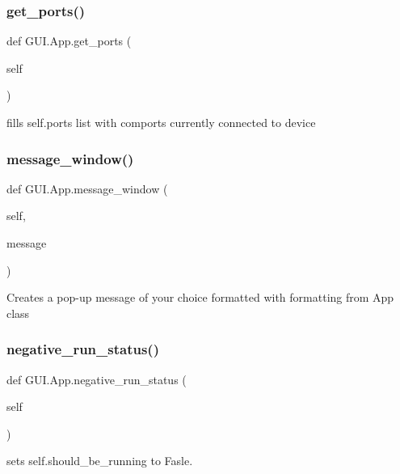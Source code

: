 \subsubsection{\texorpdfstring{get\_ports()}{get\_ports()}}
{\footnotesize\ttfamily def G\+U\+I.\+App.\+get\+\_\+ports (\begin{DoxyParamCaption}\item[{}]{self }\end{DoxyParamCaption})}

\begin{DoxyVerb}fills self.ports list with comports currently connected to device
\end{DoxyVerb}
 \mbox{\label{class_g_u_i_1_1_app_a7e1fdfe0c29ab317d09afccdc5c89004}} 
\subsubsection{\texorpdfstring{message\_window()}{message\_window()}}
{\footnotesize\ttfamily def G\+U\+I.\+App.\+message\+\_\+window (\begin{DoxyParamCaption}\item[{}]{self,  }\item[{}]{message }\end{DoxyParamCaption})}

\begin{DoxyVerb}Creates a pop-up message of your choice formatted with 
formatting from App class\end{DoxyVerb}
 \mbox{\label{class_g_u_i_1_1_app_a9547dcee8b0b3ece61097567d64dd091}} 
\subsubsection{\texorpdfstring{negative\_run\_status()}{negative\_run\_status()}}
{\footnotesize\ttfamily def G\+U\+I.\+App.\+negative\+\_\+run\+\_\+status (\begin{DoxyParamCaption}\item[{}]{self }\end{DoxyParamCaption})}

\begin{DoxyVerb}sets self.should_be_running to Fasle.
\end{DoxyVerb}
 \mbox{\label{class_g_u_i_1_1_app_a50ee4df32de54f61e2eac0c1a4e52590}} 
